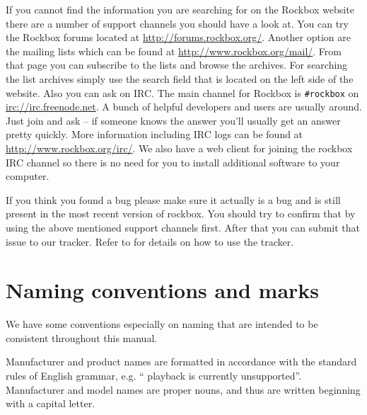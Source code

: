 If you cannot find the information you are searching for on the Rockbox
website there are a number of support channels you should have a look at.
You can try the Rockbox forums located at \url{http://forums.rockbox.org/}.
Another option are the mailing lists which can be found at
\url{http://www.rockbox.org/mail/}. From that page you can subscribe to the
lists and browse the archives. For searching the list archives simply use
the search field that is located on the left side of the website.
Also you can ask on IRC. The main channel for Rockbox is \texttt{\#rockbox}
on \url{irc://irc.freenode.net}. A bunch of helpful developers and users
are usually around. Just join and ask -- if someone knows the answer you'll
usually get an answer pretty quickly. More information including IRC logs
can be found at \url{http://www.rockbox.org/irc/}. We also have a web client
for joining the rockbox IRC channel so there is no need for you
to install additional software to your computer.

If you think you found a bug please make sure it actually is a bug and is
still present in the most recent version of rockbox. You should try to
confirm that by using the above mentioned support channels first. After that
you can submit that issue to our tracker. Refer to 
for details on how to use the tracker.


\section{Naming conventions and marks}
We have some conventions especially on naming that are intended to be
consistent throughout this manual.

Manufacturer and product names are formatted in accordance with the standard
rules of English grammar, e.g. ``\playerman{} playback is currently
unsupported''. Manufacturer and model names are proper nouns, and
thus are written beginning with a capital letter.


